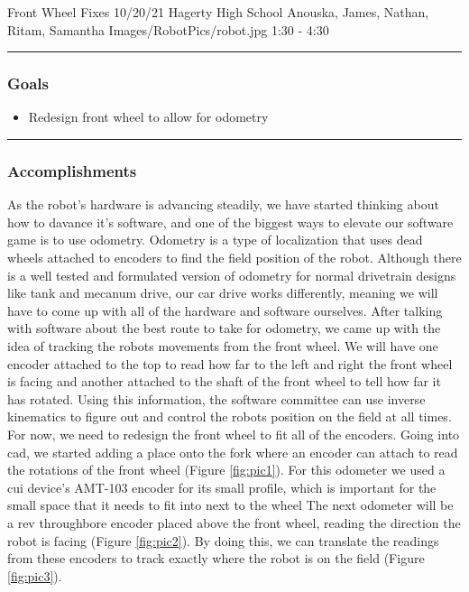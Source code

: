 \insertmeeting 
	{Front Wheel Fixes} 
	{10/20/21}
	{Hagerty High School}
	{Anouska, James, Nathan, Ritam, Samantha}
	{Images/RobotPics/robot.jpg}
	{1:30 - 4:30}
	
\noindent\hfil\rule{\textwidth}{.4pt}\hfil
\subsubsection*{Goals}
\begin{itemize}
    \item Redesign front wheel to allow for odometry 

\end{itemize} 

\noindent\hfil\rule{\textwidth}{.4pt}\hfil

\subsubsection*{Accomplishments}
As the robot’s hardware is advancing steadily, we have started thinking about how to davance it’s software, and one of the biggest ways to elevate our software game is to use odometry. Odometry is a type of localization that uses dead wheels attached to encoders to find the field position of the robot. Although there is a well tested and formulated version of odometry for normal drivetrain designs like tank and mecanum drive, our car drive works differently, meaning we will have to come up with all of the hardware and software ourselves. After talking with software about the best route to take for odometry, we came up with the idea of tracking the robots movements from the front wheel. We will have one encoder attached to the top to read how far to the left and right the front wheel is facing and another attached to the shaft of the front wheel to tell how far it has rotated. Using this information, the software committee can use inverse kinematics to figure out and control the robots position on the field at all times. For now, we need to redesign the front wheel to fit all of the encoders. Going into cad, we started adding a place onto the fork where an encoder can attach to read the rotations of the front wheel (Figure \ref{fig:pic1}). For this odometer we used a cui device's AMT-103 encoder for its small profile, which is important for the small space that it needs to fit into next to the wheel The next odometer will be a rev throughbore encoder placed above the front wheel, reading the direction the robot is facing (Figure \ref{fig:pic2}). By doing this, we can translate the readings from these encoders to track exactly where the robot is on the field (Figure \ref{fig:pic3}). 

